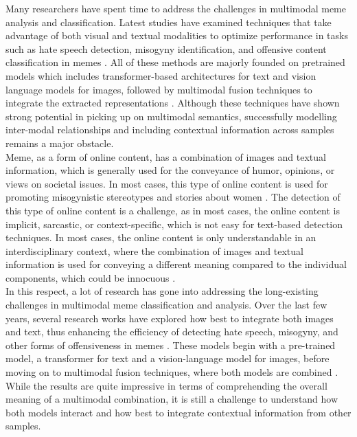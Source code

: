 \documentclass[a4paper]{cas-sc}
\begin{document}
Many researchers have spent time to address the challenges in multimodal meme analysis and classification. Latest studies have examined techniques that take advantage of both visual and textual modalities to optimize performance in tasks such as hate speech detection, misogyny identification, and offensive content classification in memes \cite{kanwar2025wbms} \cite{rehman2025contextaware}. All of these methods are majorly founded on pretrained models which includes transformer-based architectures for text and vision language models for images, followed by multimodal fusion techniques to integrate the extracted representations \cite{devlin2019bert} \cite{radford2021clip} \cite{aggarwal2026multimodal}. Although these techniques have shown strong potential in picking up on multimodal semantics, successfully modelling inter-modal relationships and  including contextual information across samples remains a major obstacle.
\\

Meme, as a form of online content, has a combination of images and textual information, which is generally used for the conveyance of humor, opinions, or views on societal issues. In most cases, this type of online content is used for promoting misogynistic stereotypes and stories about women \cite{kanwar2025wbms}. The detection of this type of online content is a challenge, as in most cases, the online content is implicit, sarcastic, or context-specific, which is not easy for text-based detection techniques. In most cases, the online content is only understandable in an interdisciplinary context, where the combination of images and textual information is used for conveying a different meaning compared to the individual components, which could be innocuous \cite{rehman2025contextaware}.
\\

In this respect, a lot of research has gone into addressing the long-existing challenges in multimodal meme classification and analysis. Over the last few years, several research works have explored how best to integrate both images and text, thus enhancing the efficiency of detecting hate speech, misogyny, and other forms of offensiveness in memes \cite{kanwar2025wbms,rehman2025contextaware}. These models begin with a pre-trained model, a transformer for text and a vision-language model for images, before moving on to multimodal fusion techniques, where both models are combined \cite{devlin2019bert,radford2021clip,aggarwal2026multimodal}. While the results are quite impressive in terms of comprehending the overall meaning of a multimodal combination, it is still a challenge to understand how both models interact and how best to integrate contextual information from other samples.
\\
\end{document}
